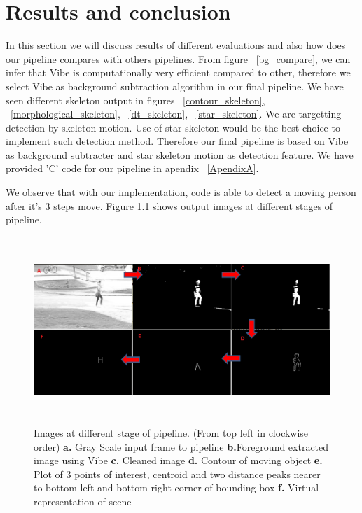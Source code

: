 
\chapter{Results and conclusion} %
\label{Chapter3}

\indent In this section we will discuss results of different evaluations
and also how does our pipeline compares with others pipelines. From
figure ~\ref{bg_compare}, we can infer that Vibe is computationally very
efficient compared to other, therefore we select Vibe as background
subtraction algorithm in our final pipeline. We have seen different
skeleton output in figures ~\ref{contour_skeleton},
~\ref{morphological_skeleton}, ~\ref{dt_skeleton}, ~\ref{star_skeleton}.
We are targetting detection by skeleton motion. Use of star skeleton
would be the best choice to implement such detection method. Therefore
our final pipeline is based on Vibe as background subtracter and star
skeleton motion as detection feature. We have provided 'C' code for our
pipeline in apendix ~\ref{ApendixA}.

\indent We observe that with our implementation, code is able to detect
a moving person after it's 3 steps move. Figure  \ref{pipeline_images}
shows output images at different stages of pipeline.

\begin{figure}[!b]
\centering
\includegraphics[height=200pt]{Figures/pipeline_images}
\caption{Images at different stage of pipeline. (From top left in
clockwise order) \textbf{a.} Gray Scale input frame to pipeline
\textbf{b.}Foreground extracted image using Vibe \textbf{c.} Cleaned
image \textbf{d.} Contour of moving object \textbf{e.} Plot of 3 points
of interest, centroid and two distance peaks nearer to bottom left and
bottom right corner of bounding box \textbf{f.} Virtual representation
of scene} 
\label{pipeline_images}
\end{figure}

